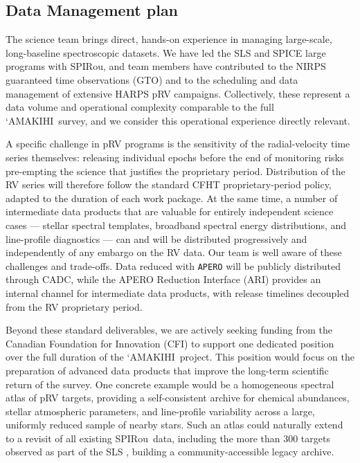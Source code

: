 \documentclass[
    traditabstract,
    longauth,
    onecolumn,
]{aa}
\def \amakihi{`AMAKIHI}
\def \spi{SPIRou}
\begin{document}
\subsection{Data Management plan}

The science team brings direct, hands-on experience in managing large-scale, long-baseline spectroscopic datasets. We have led the SLS and SPICE large programs with \spi, and team members have contributed to the NIRPS guaranteed time observations (GTO) and to the scheduling and data management of extensive HARPS pRV campaigns. Collectively, these represent a data volume and operational complexity comparable to the full \amakihi\ survey, and we consider this operational experience directly relevant.

A specific challenge in pRV programs is the sensitivity of the radial-velocity time series themselves: releasing individual epochs before the end of monitoring risks pre-empting the science that justifies the proprietary period. Distribution of the RV series will therefore follow the standard CFHT proprietary-period policy, adapted to the duration of each work package. At the same time, a number of intermediate data products that are valuable for entirely independent science cases --- stellar spectral templates, broadband spectral energy distributions, and line-profile diagnostics --- can and will be distributed progressively and independently of any embargo on the RV data. Our team is well aware of these challenges and trade-offs. Data reduced with \texttt{APERO} \citep{cook_apero_2022} will be publicly distributed through CADC, while the APERO Reduction Interface (ARI) provides an internal channel for intermediate data products, with release timelines decoupled from the RV proprietary period.

Beyond these standard deliverables, we are actively seeking funding from the Canadian Foundation for Innovation (CFI) to support one dedicated position over the full duration of the \amakihi\ project. This position would focus on the preparation of advanced data products that improve the long-term scientific return of the survey. One concrete example would be a homogeneous spectral atlas of pRV targets, providing a self-consistent archive for chemical abundances, stellar atmospheric parameters, and line-profile variability across a large, uniformly reduced sample of nearby stars. Such an atlas could naturally extend to a revisit of all existing \spi\ data, including the more than 300 targets observed as part of the SLS \citep{fouque_spirou_2023}, building a community-accessible legacy archive.
\end{document}
